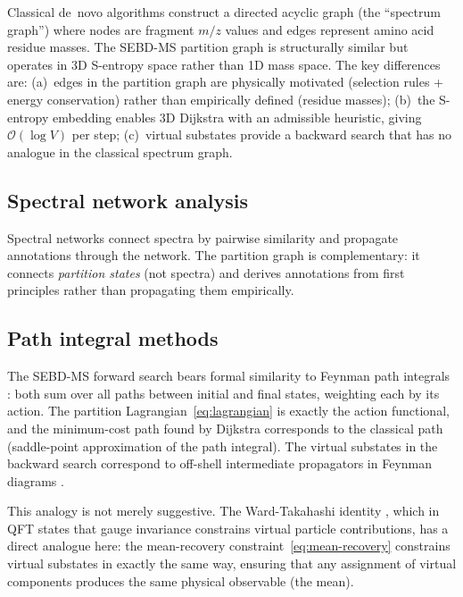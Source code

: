 \documentclass[twocolumn,10pt,a4paper]{article}
\theoremstyle{thmstyle}
\theoremstyle{definition}
\theoremstyle{remark}
\begin{document}
Classical de~novo algorithms \citep{frank2005, ma2003} construct a
directed acyclic graph (the ``spectrum graph'') where nodes are fragment
$m/z$ values and edges represent amino acid residue masses. The SEBD-MS
partition graph is structurally similar but operates in 3D S-entropy
space rather than 1D mass space. The key differences are:
(a)~edges in the partition graph are physically motivated (selection
rules + energy conservation) rather than empirically defined (residue
masses); (b)~the S-entropy embedding enables 3D Dijkstra with an
admissible heuristic, giving $\mathcal{O}(\log V)$ per step;
(c)~virtual substates provide a backward search that has no analogue
in the classical spectrum graph.

\subsection{Spectral network analysis}

Spectral networks \citep{bandeira2007} connect spectra by pairwise
similarity and propagate annotations through the network. The partition
graph is complementary: it connects \emph{partition states} (not spectra)
and derives annotations from first principles rather than propagating
them empirically.

\subsection{Path integral methods}

The SEBD-MS forward search bears formal similarity to Feynman path
integrals \citep{feynman1965}: both sum over all paths between
initial and final states, weighting each by its action. The partition
Lagrangian~\eqref{eq:lagrangian} is exactly the action functional,
and the minimum-cost path found by Dijkstra corresponds to the
classical path (saddle-point approximation of the path integral).
The virtual substates in the backward search correspond to off-shell
intermediate propagators in Feynman diagrams \citep{peskin1995}.

This analogy is not merely suggestive. The Ward-Takahashi
identity \citep{ward1950}, which in QFT states that gauge invariance
constrains virtual particle contributions, has a direct analogue here:
the mean-recovery constraint~\eqref{eq:mean-recovery} constrains
virtual substates in exactly the same way, ensuring that any
assignment of virtual components produces the same physical observable
(the mean).

\end{document}
